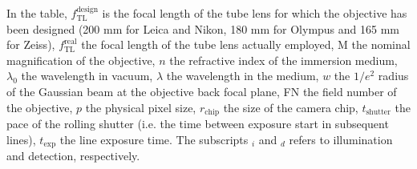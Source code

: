 \documentclass[12pt]{spieman}  %
\begin{document}
In the table, $f_{\text{TL}}^{\text{design}}$ is the focal length of the tube lens for which the objective has been designed (200 mm for Leica and Nikon, 180 mm for Olympus and 165 mm for Zeiss), $f_{\text{TL}}^{\text{real}}$ the focal length of the tube lens actually employed, $\text{M}$ the nominal magnification of the objective, $n$ the refractive index of the immersion medium, $\lambda_0$ the wavelength in vacuum, $\lambda$ the wavelength in the medium, $w$ the $1/e^2$ radius of the Gaussian beam at the objective back focal plane, FN the field number of the objective, $p$ the physical pixel size, $r_{\text{chip}}$ the size of the camera chip, $t_{\text{shutter}}$ the pace of the rolling shutter (i.e. the time between exposure start in subsequent lines), $ t_{\text{exp}}$ the line exposure time. The subscripts $_i$ and $_d$ refers to illumination and detection, respectively.
\end{document}
